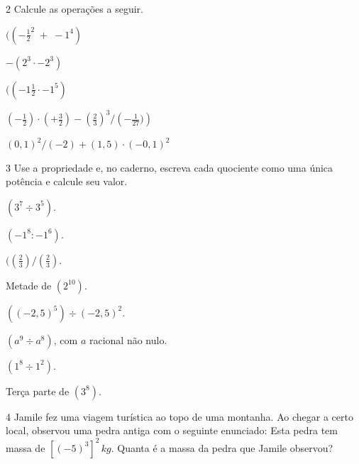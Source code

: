 \num{2} Calcule as operações a seguir.

\begin{escolha}[itemsep=0pt]
\item $(( - \frac{1}{2}^2 \; + \; -1^4)$ 
\item $ - (2^3 \cdot -2^3)$ 
\item $(( - 1\frac{1}{2} \cdot -1^5)$ 
\item $\left ( - \frac{1}{2} \right) \cdot \left( + \frac{3}{2} \right) - \left ( \frac{2}{3} \right)^{3} / \left ( - \frac{1}{27}) \right)$  
\item $(0,1) ^2 / (-2) + (1,5) \cdot (-0,1)^2$ 
\end{escolha}







\num{3} Use a propriedade e, no caderno, escreva cada quociente como uma
única potência e calcule seu valor.


\begin{escolha}[itemsep=0pt]
\item $(3^7 \div 3^5)$. 
\item $(-1^8:-1^6)$. 
\item $(\left( \frac{2}{3} \right) / \left ( \frac{2}{3} \right)$. 
\item Metade de $(2^10)$. 
\item $((-2,5)^5) \div (-2,5)^2$. 
\item $(a^9 \div a^8)$, com $a$ racional não nulo.
\item $(1^8 \div 1^2)$.
\item Terça parte de $(3^8)$.
\end{escolha}



\num{4} Jamile fez uma viagem turística ao topo de uma montanha. Ao chegar a
certo local, observou uma pedra antiga com o seguinte enunciado: Esta
pedra tem massa de $[(-5)^3]^2\,kg$. Quanta é a massa da pedra que Jamile
observou?

